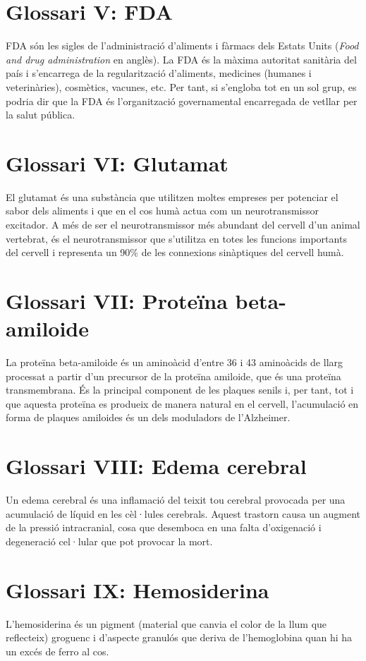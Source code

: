 \documentclass[a4paper,12pt]{report}
\begin{document}
\section*{Glossari V: FDA}
FDA són les sigles de l'administració d'aliments i fàrmacs dels Estats Units (\textit{Food and drug administration} en anglès). La FDA és la màxima autoritat sanitària del país i s'encarrega de la regularització d'aliments, medicines (humanes i veterinàries), cosmètics, vacunes, etc. Per tant, si s'engloba tot en un sol grup, es podria dir que la FDA és l'organització governamental encarregada de vetllar per la salut pública.
\section*{Glossari VI: Glutamat}
El glutamat és una substància que utilitzen moltes empreses per potenciar el sabor dels aliments i que en el cos humà actua com un neurotransmissor excitador. A més de ser el neurotransmissor més abundant del cervell d'un animal vertebrat, és el neurotransmissor que s'utilitza en totes les funcions importants del cervell i representa un 90\% de les connexions sinàptiques del cervell humà.
\section*{Glossari VII: Proteïna beta-amiloide}
La proteïna beta-amiloide és un aminoàcid d'entre 36 i 43 aminoàcids de llarg processat a partir d'un precursor de la proteïna amiloide, que és una proteïna transmembrana. És la principal component de les plaques senils i, per tant, tot i que aquesta proteïna es produeix de manera natural en el cervell, l'acumulació en forma de plaques amiloides és un dels moduladors de l'Alzheimer.
\section*{Glossari VIII: Edema cerebral}
Un edema cerebral és una inflamació del teixit tou cerebral provocada per una acumulació de líquid en les cèl·lules cerebrals. Aquest trastorn causa un augment de la pressió intracranial, cosa que desemboca en una falta d'oxigenació i degeneració cel·lular que pot provocar la mort.
\section*{Glossari IX: Hemosiderina}
L'hemosiderina és un pigment (material que canvia el color de la llum que reflecteix) groguenc i d'aspecte granulós que deriva de l'hemoglobina quan hi ha un excés de ferro al cos.
\end{document}
